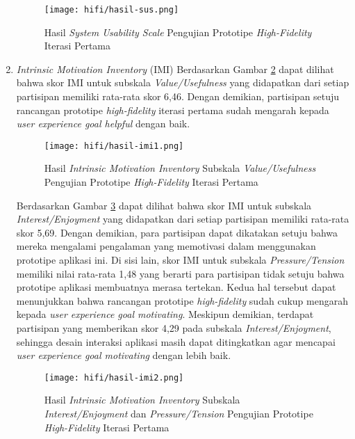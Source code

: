 \begin{enumerate}
  \begin{figure}[h]
    \centering
    \texttt{[image: hifi/hasil-sus.png]}
    \caption{Hasil \textit{System Usability Scale} Pengujian Prototipe \textit{High-Fidelity} Iterasi Pertama}
    \label{img:sus_1}
  \end{figure}
  \FloatBarrier

  \item \textit{Intrinsic Motivation Inventory} (IMI)
  \subitem  Berdasarkan Gambar \ref{img:imi1_1} dapat dilihat bahwa skor IMI untuk subskala \textit{Value/Usefulness} yang didapatkan dari setiap partisipan memiliki rata-rata skor 6,46. Dengan demikian, partisipan setuju rancangan prototipe \textit{high-fidelity} iterasi pertama sudah mengarah kepada \textit{user experience goal helpful} dengan baik.
  
  \begin{figure}[h]
    \centering
    \texttt{[image: hifi/hasil-imi1.png]}
    \caption{Hasil \textit{Intrinsic Motivation Inventory} Subskala \textit{Value/Usefulness} Pengujian Prototipe \textit{High-Fidelity} Iterasi Pertama}
    \label{img:imi1_1}
  \end{figure}
  \FloatBarrier
  
  \subitem  Berdasarkan Gambar \ref{img:imi2_1} dapat dilihat bahwa skor IMI untuk subskala \textit{Interest/Enjoyment} yang didapatkan dari setiap partisipan memiliki rata-rata skor 5,69. Dengan demikian, para partisipan dapat dikatakan setuju bahwa mereka mengalami pengalaman yang memotivasi dalam menggunakan prototipe aplikasi ini. Di sisi lain, skor IMI untuk subskala \textit{Pressure/Tension} memiliki nilai rata-rata 1,48 yang berarti para partisipan tidak setuju bahwa prototipe aplikasi membuatnya merasa tertekan. Kedua hal tersebut dapat menunjukkan bahwa rancangan prototipe \textit{high-fidelity} sudah cukup mengarah kepada \textit{user experience goal motivating}. Meskipun demikian, terdapat partisipan yang memberikan skor 4,29 pada subskala \textit{Interest/Enjoyment}, sehingga desain interaksi aplikasi masih dapat ditingkatkan agar mencapai \textit{user experience goal motivating} dengan lebih baik.

  \begin{figure}[h]
    \centering
    \texttt{[image: hifi/hasil-imi2.png]}
    \caption{Hasil \textit{Intrinsic Motivation Inventory} Subskala \textit{Interest/Enjoyment} dan \textit{Pressure/Tension} Pengujian Prototipe \textit{High-Fidelity} Iterasi Pertama}
    \label{img:imi2_1}
  \end{figure}
  \FloatBarrier

\end{enumerate}




